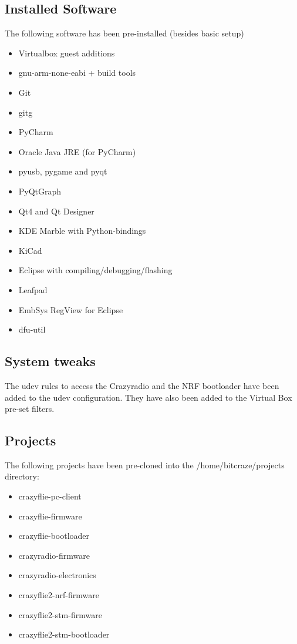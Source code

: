 \documentclass[]{article}
\begin{document}
\subsection{Installed Software}
\noindent The following software has been pre-installed (besides basic setup)
\begin{multicols}{2}
\begin{itemize}
\item Virtualbox guest additions
\item gnu-arm-none-eabi + build tools
\item Git
\item gitg
\item PyCharm
\item Oracle Java JRE (for PyCharm)
\item pyusb, pygame and pyqt
\item PyQtGraph
\item Qt4 and Qt Designer
\item KDE Marble with Python-bindings
\item KiCad
\item Eclipse with compiling/debugging/flashing
\item Leafpad
\item EmbSys RegView for Eclipse
\item dfu-util
\end{itemize}
\end{multicols}

\subsection{System tweaks}
\noindent The udev rules to access the Crazyradio and the NRF bootloader have been added to the udev configuration. They have also been added to the Virtual Box pre-set filters.

\subsection{Projects}
\noindent The following projects have been pre-cloned into the /home/bitcraze/projects directory:

\begin{multicols}{2}
\begin{itemize}
\item crazyflie-pc-client
\item crazyflie-firmware
\item crazyflie-bootloader
\item crazyradio-firmware
\item crazyradio-electronics
\item crazyflie2-nrf-firmware
\item crazyflie2-stm-firmware
\item crazyflie2-stm-bootloader
\end{itemize}
\end{multicols}
\end{document}
